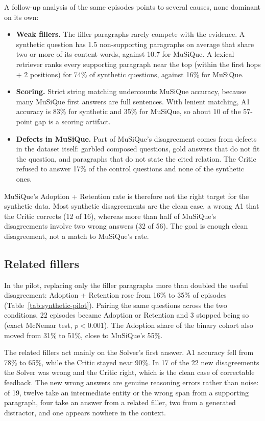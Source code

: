A follow-up analysis of the same episodes points to several causes, none
dominant on its own:
\begin{itemize}
    \item \textbf{Weak fillers.} The filler paragraphs rarely compete with
    the evidence. A synthetic question has 1.5 non-supporting paragraphs on
    average that share two or more of its content words, against 10.7 for
    MuSiQue. A lexical retriever ranks every supporting paragraph near the
    top (within the first hops + 2 positions) for 74\% of synthetic questions,
    against 16\% for MuSiQue.
    \item \textbf{Scoring.} Strict string matching undercounts MuSiQue
    accuracy, because many MuSiQue first answers are full sentences. With
    lenient matching, A1 accuracy is 83\% for synthetic and 35\% for
    MuSiQue, so about 10 of the 57-point gap is a scoring artifact.
    \item \textbf{Defects in MuSiQue.} Part of MuSiQue's disagreement comes
    from defects in the dataset itself: garbled composed questions, gold
    answers that do not fit the question, and paragraphs that do not state
    the cited relation. The Critic refused to answer 17\% of the control
    questions and none of the synthetic ones.
\end{itemize}

MuSiQue's Adoption + Retention rate is therefore not the right target for
the synthetic data. Most synthetic disagreements are the clean case, a
wrong A1 that the Critic corrects (12 of 16), whereas more than half of
MuSiQue's disagreements involve two wrong answers (32 of 56). The goal is
enough clean disagreement, not a match to MuSiQue's rate.

\subsection{Related fillers}
\label{sec:res-fillers}

In the pilot, replacing only the filler paragraphs more than doubled the
useful disagreement: Adoption + Retention rose from 16\% to 35\% of episodes
(Table~\ref{tab:synthetic-pilot}). Pairing the same questions across the two
conditions, 22 episodes became Adoption or Retention and 3 stopped being so
(exact McNemar test, $p < 0.001$). The Adoption share of the binary cohort
also moved from 31\% to 51\%, close to MuSiQue's 55\%.

The related fillers act mainly on the Solver's first answer. A1 accuracy fell
from 78\% to 65\%, while the Critic stayed near 90\%. In 17 of the 22 new
disagreements the Solver was wrong and the Critic right, which is the clean
case of correctable feedback. The new wrong answers are genuine reasoning
errors rather than noise: of 19, twelve take an intermediate entity or the
wrong span from a supporting paragraph, four take an answer from a related
filler, two from a generated distractor, and one appears nowhere in the
context.

